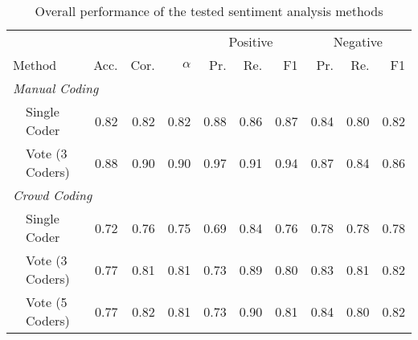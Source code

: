 \begin{table}
  \caption{Overall performance of the tested sentiment analysis methods}
\begin{tabularx}{\textwidth}{lXXrrrrrrrrr}
\toprule
& & & & & & \multicolumn{3}{c}{Positive} & \multicolumn{3}{c}{Negative} \\
\cmidrule(r){7-9}\cmidrule(l){10-12} 
\multicolumn{3}{l}{Method} & Acc. & Cor. & $\alpha$ & Pr. & Re. & F1& Pr. & Re. & F1 \\
\midrule

\multicolumn{11}{l}{\emph{ Manual Coding }} \\

 & \multicolumn{2}{l}{ Single Coder }& \cellcolor[gray]{0.59} 0.82& \cellcolor[gray]{0.59} 0.82& \cellcolor[gray]{0.59} 0.82& \cellcolor[gray]{0.56} 0.88& \cellcolor[gray]{0.57} 0.86& \cellcolor[gray]{0.57} 0.87& \cellcolor[gray]{0.58} 0.84& \cellcolor[gray]{0.60} 0.80& \cellcolor[gray]{0.59} 0.82\\

 & \multicolumn{2}{l}{ Vote (3 Coders) }& \cellcolor[gray]{0.56} 0.88& \cellcolor[gray]{0.55} 0.90& \cellcolor[gray]{0.55} 0.90& \cellcolor[gray]{0.52} 0.97& \cellcolor[gray]{0.54} 0.91& \cellcolor[gray]{0.53} 0.94& \cellcolor[gray]{0.56} 0.87& \cellcolor[gray]{0.58} 0.84& \cellcolor[gray]{0.57} 0.86\\


\multicolumn{11}{l}{\emph{ Crowd Coding }} \\

 & \multicolumn{2}{l}{ Single Coder }& \cellcolor[gray]{0.64} 0.72& \cellcolor[gray]{0.62} 0.76& \cellcolor[gray]{0.62} 0.75& \cellcolor[gray]{0.65} 0.69& \cellcolor[gray]{0.58} 0.84& \cellcolor[gray]{0.62} 0.76& \cellcolor[gray]{0.61} 0.78& \cellcolor[gray]{0.61} 0.78& \cellcolor[gray]{0.61} 0.78\\

 & \multicolumn{2}{l}{ Vote (3 Coders) }& \cellcolor[gray]{0.62} 0.77& \cellcolor[gray]{0.59} 0.81& \cellcolor[gray]{0.60} 0.81& \cellcolor[gray]{0.63} 0.73& \cellcolor[gray]{0.55} 0.89& \cellcolor[gray]{0.60} 0.80& \cellcolor[gray]{0.58} 0.83& \cellcolor[gray]{0.59} 0.81& \cellcolor[gray]{0.59} 0.82\\

 & \multicolumn{2}{l}{ Vote (5 Coders) }& \cellcolor[gray]{0.62} 0.77& \cellcolor[gray]{0.59} 0.82& \cellcolor[gray]{0.59} 0.81& \cellcolor[gray]{0.63} 0.73& \cellcolor[gray]{0.55} 0.90& \cellcolor[gray]{0.60} 0.81& \cellcolor[gray]{0.58} 0.84& \cellcolor[gray]{0.60} 0.80& \cellcolor[gray]{0.59} 0.82\\



\end{tabularx}
\end{table}
